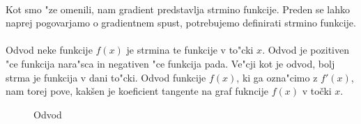 \paragraph{}
Kot smo "ze omenili, nam gradient predstavlja strmino funkcije. Preden se lahko naprej pogovarjamo o gradientnem spust, potrebujemo definirati strmino funkcije.

\paragraph{}
Odvod neke funkcije $f(x)$ je strmina te funkcije v to"cki $x$. Odvod je pozitiven "ce funkcija nara"sca in negativen "ce funkcija pada. Ve"cji kot je odvod, bolj strma je funkcija v dani to"cki. Odvod funkcije $f(x)$, ki ga ozna"cimo z $f'(x)$, nam torej pove, kakšen je koeficient tangente na graf fukncije $ f(x) $ v točki $x$.


\begin{figure}[!h]
	\centering
	\caption{Odvod}
\end{figure}

